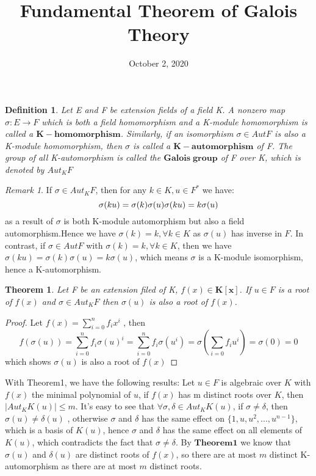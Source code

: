 \documentclass[a4paper, 11pt]{article}
\title{Fundamental Theorem of Galois Theory}
\date{October 2, 2020}
\newtheorem{difinition}{Definition}
\newtheorem{theorem}{Theorem}
\theoremstyle{remark}
\newtheorem*{remark}{Remark}
\theoremstyle{definition}
\begin{document}
    \maketitle
    \begin{difinition}
            Let E and F be extension fields of a field K. A nonzero map $\sigma:E\rightarrow F$ which is both a field homomorphism and a 
            K-module homomorphism is called a $\mathbf{K-homomorphism}$. Similarly, if an isomorphism $\sigma\in Aut F$ is also a 
            K-module homomorphism, then $\sigma$ is called a $\mathbf{K-automorphism}$ of F. The group of all K-automorphism 
            is called the $\mathbf{Galois\; group}$ of F over K, which is denoted by $Aut_K F$
    \end{difinition}
    \vspace{0.3cm}
    \begin{remark}
            If $\sigma\in Aut_KF$, then for any $k\in K, u\in F^{*}$ we have:
            $$
            \sigma(ku)=\sigma(k)\sigma(u)\\
            \sigma(ku)=k\sigma(u)
            $$ as a result of $\sigma$ is both K-module automorphism but also a field automorphism.Hence we have $\sigma(k)=k, \forall k\in K$ as $\sigma(u)$ has inverse in $F$.
            In contrast, if $\sigma \in Aut F$ with $\sigma(k)=k, \forall k\in K$, then we have $\sigma(ku)=\sigma(k)\sigma(u)=k\sigma(u)$, which means $\sigma$ is a K-module isomorphism, hence a K-automorphism.
            
    \end{remark}

    \vspace{0.5cm}
    \begin{theorem}
            Let F be an extension filed of K, $f(x)\in \mathbf{K[x]}$. If $u\in F$
            is a root of $f(x)$ and $\sigma \in Aut_K F$ then $\sigma(u)$ is also a root 
            of $f(x)$.
            
    \end{theorem}
    \vspace{0.3cm}
    \begin{proof}
            Let $\displaystyle f(x)=\sum_{i=0}^{n}f_i x^i$ , then $$\displaystyle f(\sigma(u))=\sum_{i=0}^{n}f_i \sigma(u)^i
            = \sum_{i=0}^{n}f_i \sigma(u^i) = \sigma(\sum_{i=0}f_i u^i ) = \sigma(0)=0$$
            which shows $\sigma(u)$ is also a root of $f(x)$
    \end{proof}
    \vspace{0.3cm}
    \indent With Theorem1, we have the following results: Let $u\in F$ is algebraic over $K$
    with $f(x)$ the minimal polynomial of $u$, if $f(x)$ has m distinct roots over $K$,
    then $|Aut_K K(u)|\leq m$. It's easy to see that $\forall \sigma, \delta \in Aut_K K(u)$,
    if $\sigma \neq \delta$, then $\sigma(u)\neq \delta(u)$ , otherwise $\sigma$ and $\delta$ has the same effect on $\{1, u, u^2,...,u^{n-1}\}$, which is a basis of $K(u)$, hence $\sigma$ and $\delta$ has the same effect on all elements of $K(u)$, which contradicts the fact that $\sigma\neq \delta$. By $\textbf{Theorem1}$ we know that $\sigma(u)$ and $\delta(u)$ are distinct roots of $f(x)$, so there are at most $m$ distinct K-automorphism as there are at most $m$ distinct roots.
\end{document}
